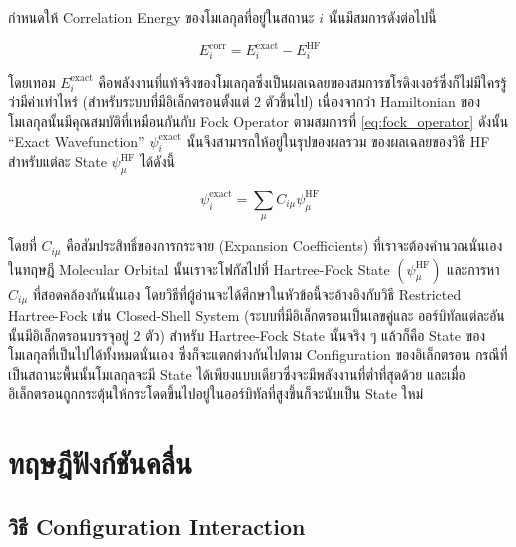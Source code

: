 กำหนดให้ Correlation Energy ของโมเลกุลที่อยู่ในสถานะ $i$ นั้นมีสมการดังต่อไปนี้

\begin{equation}
    \label{eq:Correlation_Energy}
    E^{\text{corr}}_{i}
    =
    E^{\text{exact}}_{i} - E^{\text{HF}}_{i}
\end{equation}

\noindent โดยเทอม $E^{\text{exact}}_{i}$ คือพลังงานที่แท้จริงของโมเลกุลซึ่งเป็นผลเฉลยของสมการชโรดิงเงอร์ซึ่งก็ไม่มีใครรู้ว่ามีค่าเท่าไหร่
(สำหรับระบบที่มีอิเล็กตรอนตั้งแต่ 2 ตัวขึ้นไป) เนื่องจากว่า Hamiltonian ของโมเลกุลนั้นมีคุณสมบัติที่เหมือนกันกับ Fock Operator ตามสมการที่
\eqref{eq:fock_operator} ดังนั้น \enquote{Exact Wavefunction} $\psi^{\text{exact}}_{i}$ นั้นจึงสามารถให้อยู่ในรุปของผลรวม%
ของผลเฉลยของวิธี HF สำหรับแต่ละ State $\psi^{\text{HF}}_{\mu}$ ได้ดังนี้

\begin{equation}
    \label{eq:Exact_Wavefunction}
    \psi^{\text{exact}}_{i}
    =
    \sum_{\mu} C_{i \mu} \psi^{\text{HF}}_{\mu}
\end{equation}

\noindent โดยที่ $C_{i \mu}$ คือสัมประสิทธิ์ของการกระจาย (Expansion Coefficients) ที่เราจะต้องคำนวณนั่นเอง ในทฤษฎี Molecular
Orbital นั้นเราจะโฟกัสไปที่ Hartree-Fock State $(\psi^{\text{HF}}_{\mu})$ และการหา $C_{i \mu}$ ที่สอดคล้องกันนั่นเอง
โดยวิธีที่ผู้อ่านจะได้ศึกษาในหัวข้อนี้จะอ้างอิงกับวิธี Restricted Hartree-Fock เช่น Closed-Shell System (ระบบที่มีอิเล็กตรอนเป็นเลขคู่และ%
ออร์บิทัลแต่ละอันนั้นมีอิเล็กตรอนบรรจุอยู่ 2 ตัว) สำหรับ Hartree-Fock State นั้นจริง ๆ แล้วก็คือ State ของโมเลกุลที่เป็นไปได้ทั้งหมดนั่นเอง%
ซึ่งก็จะแตกต่างกันไปตาม Configuration ของอิเล็กตรอน กรณีที่เป็นสถานะพื้นนั้นโมเลกุลจะมี State ได้เพียงแบบเดียวซึ่งจะมีพลังงานที่ต่ำที่สุดด้วย%
และเมื่ออิเล็กตรอนถูกกระตุ้นให้กระโดดขึ้นไปอยู่ในออร์บิทัลที่สูงขึ้นก็จะนับเป็น State ใหม่

\section{ทฤษฎีฟังก์ชันคลื่น}

\subsection{วิธี Configuration Interaction}

